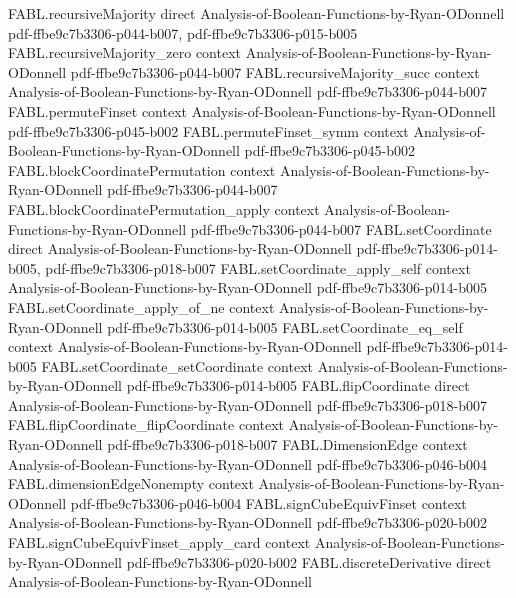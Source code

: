 \begin{theorem}
\proofstep
  {FABL.recursiveMajority}
  {direct}
  {Analysis-of-Boolean-Functions-by-Ryan-ODonnell}
  {pdf-ffbe9c7b3306-p044-b007,
    pdf-ffbe9c7b3306-p015-b005}
\proofstep
  {FABL.recursiveMajority_zero}
  {context}
  {Analysis-of-Boolean-Functions-by-Ryan-ODonnell}
  {pdf-ffbe9c7b3306-p044-b007}
\proofstep
  {FABL.recursiveMajority_succ}
  {context}
  {Analysis-of-Boolean-Functions-by-Ryan-ODonnell}
  {pdf-ffbe9c7b3306-p044-b007}
\proofstep
  {FABL.permuteFinset}
  {context}
  {Analysis-of-Boolean-Functions-by-Ryan-ODonnell}
  {pdf-ffbe9c7b3306-p045-b002}
\proofstep
  {FABL.permuteFinset_symm}
  {context}
  {Analysis-of-Boolean-Functions-by-Ryan-ODonnell}
  {pdf-ffbe9c7b3306-p045-b002}
\proofstep
  {FABL.blockCoordinatePermutation}
  {context}
  {Analysis-of-Boolean-Functions-by-Ryan-ODonnell}
  {pdf-ffbe9c7b3306-p044-b007}
\proofstep
  {FABL.blockCoordinatePermutation_apply}
  {context}
  {Analysis-of-Boolean-Functions-by-Ryan-ODonnell}
  {pdf-ffbe9c7b3306-p044-b007}
\proofstep
  {FABL.setCoordinate}
  {direct}
  {Analysis-of-Boolean-Functions-by-Ryan-ODonnell}
  {pdf-ffbe9c7b3306-p014-b005,
    pdf-ffbe9c7b3306-p018-b007}
\proofstep
  {FABL.setCoordinate_apply_self}
  {context}
  {Analysis-of-Boolean-Functions-by-Ryan-ODonnell}
  {pdf-ffbe9c7b3306-p014-b005}
\proofstep
  {FABL.setCoordinate_apply_of_ne}
  {context}
  {Analysis-of-Boolean-Functions-by-Ryan-ODonnell}
  {pdf-ffbe9c7b3306-p014-b005}
\proofstep
  {FABL.setCoordinate_eq_self}
  {context}
  {Analysis-of-Boolean-Functions-by-Ryan-ODonnell}
  {pdf-ffbe9c7b3306-p014-b005}
\proofstep
  {FABL.setCoordinate_setCoordinate}
  {context}
  {Analysis-of-Boolean-Functions-by-Ryan-ODonnell}
  {pdf-ffbe9c7b3306-p014-b005}
\proofstep
  {FABL.flipCoordinate}
  {direct}
  {Analysis-of-Boolean-Functions-by-Ryan-ODonnell}
  {pdf-ffbe9c7b3306-p018-b007}
\proofstep
  {FABL.flipCoordinate_flipCoordinate}
  {context}
  {Analysis-of-Boolean-Functions-by-Ryan-ODonnell}
  {pdf-ffbe9c7b3306-p018-b007}
\proofstep
  {FABL.DimensionEdge}
  {context}
  {Analysis-of-Boolean-Functions-by-Ryan-ODonnell}
  {pdf-ffbe9c7b3306-p046-b004}
\proofstep
  {FABL.dimensionEdgeNonempty}
  {context}
  {Analysis-of-Boolean-Functions-by-Ryan-ODonnell}
  {pdf-ffbe9c7b3306-p046-b004}
\proofstep
  {FABL.signCubeEquivFinset}
  {context}
  {Analysis-of-Boolean-Functions-by-Ryan-ODonnell}
  {pdf-ffbe9c7b3306-p020-b002}
\proofstep
  {FABL.signCubeEquivFinset_apply_card}
  {context}
  {Analysis-of-Boolean-Functions-by-Ryan-ODonnell}
  {pdf-ffbe9c7b3306-p020-b002}
\proofstep
  {FABL.discreteDerivative}
  {direct}
  {Analysis-of-Boolean-Functions-by-Ryan-ODonnell}

\end{theorem}
